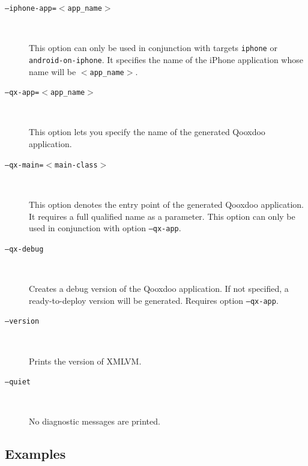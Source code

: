 \documentclass[11pt]{book}
\begin{document}
\begin{description}
\item[\texttt{--iphone-app=$<$app\_name$>$}] $ $

  This option can only be used in conjunction with targets
  \texttt{iphone} or \texttt{android-on-iphone}. It specifies the name
  of the iPhone application whose name will be
  \texttt{$<$app\_name$>$}.

\item[\texttt{--qx-app=$<$app\_name$>$}] $ $

  This option lets you specify the name of the generated Qooxdoo
  application.

\item[\texttt{--qx-main=$<$main-class$>$}] $ $

  This option denotes the entry point of the generated Qooxdoo
  application. It requires a full qualified name as a parameter. This
  option can only be used in conjunction with option
  \texttt{--qx-app}.

\item[\texttt{--qx-debug}] $ $

  Creates a debug version of the Qooxdoo application.  If not
  specified, a ready-to-deploy version will be generated.  Requires
  option \texttt{--qx-app}.

\item[\texttt{--version}] $ $

  Prints the version of XMLVM.

\item[\texttt{--quiet}] $ $

  No diagnostic messages are printed.

\end{description}


\subsection{Examples}
\label{SEC_COMMAND_LINE_OPTIONS_EXAMPLES}
\end{document}
